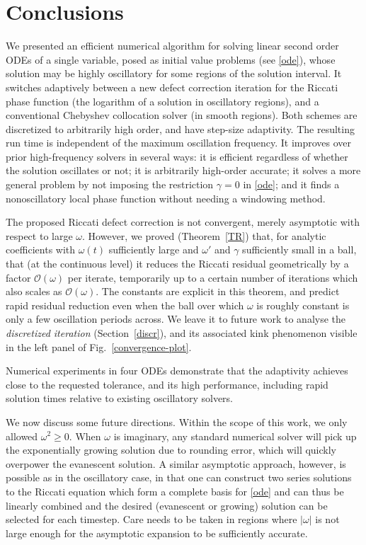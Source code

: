 \documentclass[10pt]{article}
\newcommand{\bigO}{{\mathcal O}}
\newcommand{\om}{\omega}
\newcommand{\g}{\gamma}
\begin{document}
\section{Conclusions \label{conclusions}}

We presented an efficient numerical algorithm for solving linear second order
ODEs of a single variable, posed as initial value problems (see \cref{ode}),
whose solution
may be highly oscillatory for some regions of the solution interval.
It switches adaptively between a new defect correction iteration for
the Riccati phase function (the logarithm of a solution in oscillatory regions), and
a conventional Chebyshev collocation solver (in smooth regions).
Both schemes are discretized to arbitrarily high order, and
have step-size adaptivity.
The resulting run time is independent of the maximum oscillation frequency.
It improves over prior high-frequency solvers
in several ways: it is efficient regardless of
whether the solution oscillates or not; it is arbitrarily high-order accurate;
it solves a more general problem by not imposing the restriction $\gamma =
0$ in \cref{ode}; and it finds a nonoscillatory local phase function
without needing a windowing method.


The proposed Riccati defect correction is not convergent, merely asymptotic
with respect to large $\om$.
However, we proved (Theorem~\ref{TR}) that, for analytic coefficients with
$\om(t)$ sufficiently large and $\om'$ and $\g$ sufficiently small in a ball,
that (at the continuous level) it reduces the Riccati residual
geometrically by a factor $\bigO(\om)$ per iterate, temporarily
up to a certain number of iterations which also scales as $\bigO(\om)$.
The constants are explicit in this theorem, and
predict rapid residual reduction even when the ball over which $\om$
is roughly constant is only a few oscillation periods across.
We leave it to future work to analyse the \emph{discretized iteration}
(Section~\ref{discr}), and its associated kink phenomenon visible in
the left panel of Fig.~\ref{convergence-plot}.

Numerical experiments in four ODEs demonstrate that the adaptivity
achieves close to the requested tolerance, and 
its high performance,
including rapid solution times relative to existing oscillatory solvers.

We now discuss some future directions.
%
Within the scope of this work, we only allowed $\om^2 \geq 0$. When $\om$ is
imaginary, any standard numerical solver will pick up the exponentially growing
solution due to rounding error, which will quickly overpower the evanescent
solution. A similar asymptotic approach, however, is possible as in the
oscillatory case, in that one can construct two series solutions to the Riccati
equation which form a complete basis for \cref{ode} and can thus be linearly
combined and the desired (evanescent or growing) solution can be selected for
each timestep. Care needs to be taken in regions where $|\om|$ is not large
enough for the asymptotic expansion to be sufficiently accurate.
\end{document}

